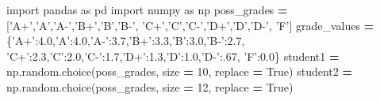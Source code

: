 \documentclass[12pt,krantz2]{krantz}
\makeatletter
\newenvironment{Shaded}{\begin{snugshade}}{\end{snugshade}}
\newcommand{\DecValTok}[1]{\textcolor[rgb]{0.06,0.06,0.06}{#1}}
\newcommand{\FloatTok}[1]{\textcolor[rgb]{0.06,0.06,0.06}{#1}}
\newcommand{\ImportTok}[1]{#1}
\newcommand{\NormalTok}[1]{#1}
\newcommand{\OperatorTok}[1]{\textcolor[rgb]{0.43,0.43,0.43}{\textbf{#1}}}
\newcommand{\StringTok}[1]{\textcolor[rgb]{0.5,0.5,0.5}{#1}}
\newcommand{\VariableTok}[1]{\textcolor[rgb]{0,0,0}{#1}}
\newenvironment{kframe}{%
\medskip{}
\setlength{\fboxsep}{.8em}
 \def\at@end@of@kframe{}%
 \ifinner\ifhmode%
  \def\at@end@of@kframe{\end{minipage}}%
  \begin{minipage}{\columnwidth}%
 \fi\fi%
 \def\FrameCommand##1{\hskip\@totalleftmargin \hskip-\fboxsep
 \colorbox{shadecolor}{##1}\hskip-\fboxsep
     \hskip-\linewidth \hskip-\@totalleftmargin \hskip\columnwidth}%
 \MakeFramed {\advance\hsize-\width
   \@totalleftmargin\z@ \linewidth\hsize
   \@setminipage}}%
 {\par\unskip\endMakeFramed%
 \at@end@of@kframe}
\renewenvironment{Shaded}{\begin{kframe}}{\end{kframe}}
\makeatother
\begin{document}
\begin{Shaded}
\begin{Highlighting}[]
\ImportTok{import}\NormalTok{ pandas }\ImportTok{as}\NormalTok{ pd}
\ImportTok{import}\NormalTok{ numpy }\ImportTok{as}\NormalTok{ np}
\NormalTok{poss_grades }\OperatorTok{=}\NormalTok{ [}\StringTok{'A+'}\NormalTok{,}\StringTok{'A'}\NormalTok{,}\StringTok{'A-'}\NormalTok{,}\StringTok{'B+'}\NormalTok{,}\StringTok{'B'}\NormalTok{,}\StringTok{'B-'}\NormalTok{,}
               \StringTok{'C+'}\NormalTok{,}\StringTok{'C'}\NormalTok{,}\StringTok{'C-'}\NormalTok{,}\StringTok{'D+'}\NormalTok{,}\StringTok{'D'}\NormalTok{,}\StringTok{'D-'}\NormalTok{,}
               \StringTok{'F'}\NormalTok{]}
\NormalTok{grade_values }\OperatorTok{=}\NormalTok{ \{}\StringTok{'A+'}\NormalTok{:}\FloatTok{4.0}\NormalTok{,}\StringTok{'A'}\NormalTok{:}\FloatTok{4.0}\NormalTok{,}\StringTok{'A-'}\NormalTok{:}\FloatTok{3.7}\NormalTok{,}\StringTok{'B+'}\NormalTok{:}\FloatTok{3.3}\NormalTok{,}\StringTok{'B'}\NormalTok{:}\FloatTok{3.0}\NormalTok{,}\StringTok{'B-'}\NormalTok{:}\FloatTok{2.7}\NormalTok{,}
                \StringTok{'C+'}\NormalTok{:}\FloatTok{2.3}\NormalTok{,}\StringTok{'C'}\NormalTok{:}\FloatTok{2.0}\NormalTok{,}\StringTok{'C-'}\NormalTok{:}\FloatTok{1.7}\NormalTok{,}\StringTok{'D+'}\NormalTok{:}\FloatTok{1.3}\NormalTok{,}\StringTok{'D'}\NormalTok{:}\FloatTok{1.0}\NormalTok{,}\StringTok{'D-'}\NormalTok{:.}\DecValTok{67}\NormalTok{,}
                \StringTok{'F'}\NormalTok{:}\FloatTok{0.0}\NormalTok{\}}
\NormalTok{student1 }\OperatorTok{=}\NormalTok{ np.random.choice(poss_grades, size }\OperatorTok{=} \DecValTok{10}\NormalTok{, replace }\OperatorTok{=} \VariableTok{True}\NormalTok{)}
\NormalTok{student2 }\OperatorTok{=}\NormalTok{ np.random.choice(poss_grades, size }\OperatorTok{=} \DecValTok{12}\NormalTok{, replace }\OperatorTok{=} \VariableTok{True}\NormalTok{)}
\end{Highlighting}
\end{Shaded}
\end{document}
